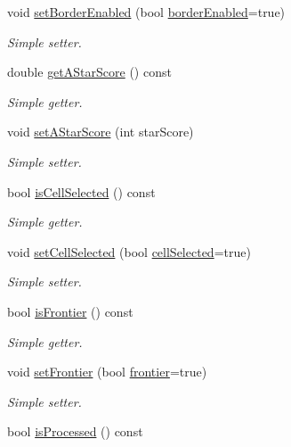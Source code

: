 \begin{DoxyCompactItemize}
void \hyperlink{classGridCell_a11419a8819e3352575dccb4a860626e0}{set\+Border\+Enabled} (bool \hyperlink{classGridCell_aa153cae8dd39f3435f0d94af62fc506c}{border\+Enabled}=true)
\begin{DoxyCompactList}\small\item\em Simple setter. \end{DoxyCompactList}\item 
double \hyperlink{classGridCell_a5ca76c4f5366e038bb04d69ebba1bfaa}{get\+A\+Star\+Score} () const 
\begin{DoxyCompactList}\small\item\em Simple getter. \end{DoxyCompactList}\item 
void \hyperlink{classGridCell_aba04e37a148ccdf854fa3d1212ae53e8}{set\+A\+Star\+Score} (int star\+Score)
\begin{DoxyCompactList}\small\item\em Simple setter. \end{DoxyCompactList}\item 
bool \hyperlink{classGridCell_abb1ed437dca40c20cf9d7ea8a46841bd}{is\+Cell\+Selected} () const 
\begin{DoxyCompactList}\small\item\em Simple getter. \end{DoxyCompactList}\item 
void \hyperlink{classGridCell_ae122cd7653166197f3956b26416f2e0a}{set\+Cell\+Selected} (bool \hyperlink{classGridCell_ace80d646d21ff2134df71a64a4b4222d}{cell\+Selected}=true)
\begin{DoxyCompactList}\small\item\em Simple setter. \end{DoxyCompactList}\item 
bool \hyperlink{classGridCell_af0d7942180a406779e395179a7882c6d}{is\+Frontier} () const 
\begin{DoxyCompactList}\small\item\em Simple getter. \end{DoxyCompactList}\item 
void \hyperlink{classGridCell_a59db9ea256eeb5f9a2ec6130794c7dcc}{set\+Frontier} (bool \hyperlink{classGridCell_ab8c610dccff54254896b67d34cb36b35}{frontier}=true)
\begin{DoxyCompactList}\small\item\em Simple setter. \end{DoxyCompactList}\item 
bool \hyperlink{classGridCell_a071e0d4c217d7992ed31cdcba1c1c10d}{is\+Processed} () const 

\end{DoxyCompactItemize}

